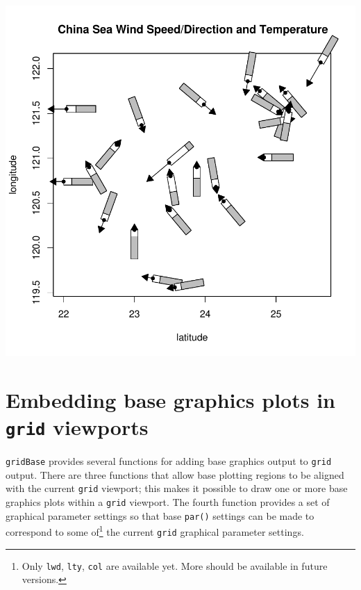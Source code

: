 \documentclass[a4paper]{article}
\newcommand{\grid}{{\tt grid}}
\newcommand{\gridBase}{{\tt gridBase}}
\begin{document}
\begin{Schunk}
\end{Schunk}
\includegraphics{gridBase-009}
\section*{Embedding base graphics plots in \grid{} viewports}

\gridBase{} provides several functions for adding base graphics 
output to \grid{} output.  There are three functions that allow
base plotting regions to be aligned with the current \grid{} 
viewport;  this makes it possible to draw one or more base graphics plots 
within
a \grid{} viewport.  The fourth function provides a set of
graphical parameter settings so that base {\tt par()} settings
can be made to correspond to some of\footnote{Only {\tt lwd},
{\tt lty}, {\tt col} are available yet.  More should be available in
future versions.} the current \grid{} graphical parameter settings.
\end{document}
